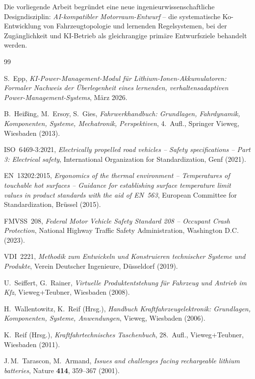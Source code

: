 ﻿\documentclass[12pt,a4paper]{article}
\begin{document}
Die vorliegende Arbeit begründet eine neue ingenieurwissenschaftliche Designdisziplin:
\textit{AI-kompatibler Motorraum-Entwurf} -- die systematische Ko-Entwicklung
von Fahrzeugtopologie und lernenden Regelsystemen, bei der Zugänglichkeit und
KI-Betrieb als gleichrangige primäre Entwurfsziele behandelt werden.

\newpage
\begin{thebibliography}{99}

	S.\ Epp,
	\textit{KI-Power-Management-Modul für Lithium-Ionen-Akkumulatoren:
		Formaler Nachweis der Überlegenheit eines lernenden,
		verhaltensadaptiven Power-Management-Systems}, März 2026.

	B.\ Heißing, M.\ Ersoy, S.\ Gies,
	\textit{Fahrwerkhandbuch: Grundlagen, Fahrdynamik, Komponenten,
		Systeme, Mechatronik, Perspektiven},
	4.\ Aufl., Springer Vieweg, Wiesbaden (2013).

	ISO~6469-3:2021,
	\textit{Electrically propelled road vehicles -- Safety specifications --
		Part 3: Electrical safety},
	International Organization for Standardization, Genf (2021).

	EN~13202:2015,
	\textit{Ergonomics of the thermal environment -- Temperatures of touchable
		hot surfaces -- Guidance for establishing surface temperature limit values
		in product standards with the aid of EN~563},
	European Committee for Standardization, Brüssel (2015).

	FMVSS~208,
	\textit{Federal Motor Vehicle Safety Standard 208 -- Occupant Crash Protection},
	National Highway Traffic Safety Administration, Washington D.C. (2023).

	VDI~2221,
	\textit{Methodik zum Entwickeln und Konstruieren technischer Systeme
		und Produkte},
	Verein Deutscher Ingenieure, Düsseldorf (2019).

	U.\ Seiffert, G.\ Rainer,
	\textit{Virtuelle Produktentstehung für Fahrzeug und Antrieb im Kfz},
	Vieweg+Teubner, Wiesbaden (2008).

	H.\ Wallentowitz, K.\ Reif (Hrsg.),
	\textit{Handbuch Kraftfahrzeugelektronik: Grundlagen, Komponenten, Systeme,
		Anwendungen},
	Vieweg, Wiesbaden (2006).

	K.\ Reif (Hrsg.),
	\textit{Kraftfahrtechnisches Taschenbuch},
	28.\ Aufl., Vieweg+Teubner, Wiesbaden (2011).

	J.\,M.\ Tarascon, M.\ Armand,
	\textit{Issues and challenges facing rechargeable lithium batteries},
	Nature \textbf{414}, 359--367 (2001).

\end{thebibliography}
\end{document}

